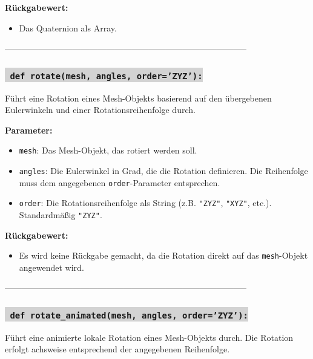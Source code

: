 \noindent \textbf{Rückgabewert:} \vspace{-6ex} \\
\begin{itemize}
    \setlength{\itemindent}{1em}
    \item Das Quaternion als Array.
\end{itemize}

--------------------------------------------------------------------------------------


\subsubsection*{\colorbox{lightgray}{\texttt{\textbf{\color{green} def} \color{blue} rotate}\textbf{\texttt{(mesh, angles, order='ZYZ'):}}}}
Führt eine Rotation eines Mesh-Objekts basierend auf den übergebenen Eulerwinkeln und einer Rotationsreihenfolge durch.

\noindent \textbf{Parameter:} \vspace{-6ex} \\
\begin{itemize}
    \setlength{\itemindent}{1em}
    \item \texttt{mesh}: Das Mesh-Objekt, das rotiert werden soll.
    \item \texttt{angles}: Die Eulerwinkel in Grad, die die Rotation definieren. Die Reihenfolge muss dem angegebenen \texttt{order}-Parameter entsprechen.
    \item \texttt{order}: Die Rotationsreihenfolge als String (z.B. \texttt{"ZYZ"}, \texttt{"XYZ"}, etc.). Standardmäßig \texttt{"ZYZ"}.
\end{itemize}

\noindent \textbf{Rückgabewert:} \vspace{-6ex} \\
\begin{itemize}
    \setlength{\itemindent}{1em}
    \item Es wird keine Rückgabe gemacht, da die Rotation direkt auf das \texttt{mesh}-Objekt angewendet wird.
\end{itemize}

--------------------------------------------------------------------------------------


\label{sec:rotate_animated}
\subsubsection*{\colorbox{lightgray}{\texttt{\textbf{\color{green} def} \color{blue} rotate\_animated}\textbf{\texttt{(mesh, angles, order='ZYZ'):}}}}
Führt eine animierte lokale Rotation eines Mesh-Objekts durch. Die Rotation erfolgt achsweise entsprechend der angegebenen Reihenfolge.

